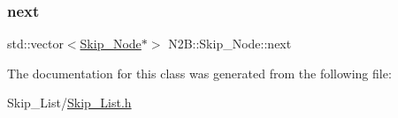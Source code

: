 \subsubsection{\texorpdfstring{next}{next}}
{\footnotesize\ttfamily std\+::vector$<$\hyperlink{class_n2_b_1_1_skip___node}{Skip\+\_\+\+Node}$\ast$$>$ N2\+B\+::\+Skip\+\_\+\+Node\+::next\hspace{0.3cm}{\ttfamily [private]}}



The documentation for this class was generated from the following file\+:\begin{DoxyCompactItemize}
\item 
Skip\+\_\+\+List/\hyperlink{_skip___list_8h}{Skip\+\_\+\+List.\+h}\end{DoxyCompactItemize}
